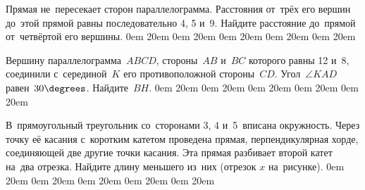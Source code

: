 Прямая не~пересекает сторон параллелограмма. Расстояния от~трёх его вершин до~этой прямой равны последовательно 4, 5 и~9. Найдите расстояние до~прямой от~четвёртой его вершины.
 0em 20em 0em 20em 0em 20em 0em 20em 0em 20em

\begin{wrapfigure}[0]{r}{30mm}
\vspace{-10mm}
\end{wrapfigure}

Вершину параллелограмма~$ABCD$, стороны~$AB$ и~$BC$ которого равны 12 и~8, соединили с~серединой~$K$ его противоположной стороны~$CD$. Угол~$\angle KAD$ равен~$30\degrees$.  Найдите~$BH$.
 0em 20em 0em 20em 0em 20em 0em 20em 0em 20em

\begin{wrapfigure}[0]{r}{30mm}
\vspace{-5mm}
\end{wrapfigure}

В~прямоугольный треугольник со~сторонами 3, 4 и~5~вписана окружность. Через точку её касания с~коротким катетом проведена прямая, перпендикулярная хорде, соединяющей две другие точки касания. 
Эта прямая разбивает второй катет на~два отрезка. Найдите длину меньшего из~них (отрезок $x$ на~рисунке).
 0em 20em 0em 20em 0em 20em 0em 20em 0em 20em

